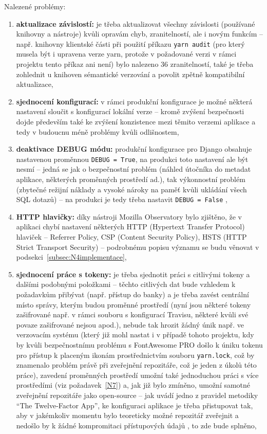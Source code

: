 Nalezené problémy:
\begin{enumerate}[label=\textbf{B\arabic*}]
    \item \label{B1} \textbf{aktualizace závislostí:} je třeba aktualizovat všechny závislosti (používané knihovny a nástroje) kvůli opravám chyb, zranitelností, ale i novým funkcím -- např. knihovny klientské části při použití příkazu \verb|yarn audit| (pro který musela být i upravena verze yarn, protože v požadované verzi v rámci projektu tento příkaz ani není) bylo nalezeno 36 zranitelností, také je třeba zohlednit u knihoven sémantické verzování a povolit zpětně kompatibilní aktualizace,
    \item \label{B2} \textbf{sjednocení konfigurací:} v rámci produkční konfigurace je možné některá nastavení sloučit s konfigurací lokální verze -- kromě zvýšení bezpečnosti dojde především také ke zvýšení konzistence mezi těmito verzemi aplikace a tedy v budoucnu méně problémy kvůli odlišnostem,
    \item \label{B3} \textbf{deaktivace DEBUG módu:} produkční konfigurace pro 
    Django obsahuje nastavenou proměnnou \verb|DEBUG = True|, na produkci toto nastavení ale být nesmí -- jedná se jak o bezpečnostní problém (náhled útočníka do metadat aplikace, některých proměnných prostředí ad.), tak výkonnostní problém (zbytečné režijní náklady a vysoké nároky na paměť kvůli ukládání všech SQL dotazů) -- na produkci je tedy třeba nastavit \verb|DEBUG = False| \cite{django-debug},
    \item \label{B4} \textbf{HTTP hlavičky:} díky nástroji Mozilla Observatory bylo zjištěno, že v aplikaci chybí nastavení některých HTTP (Hypertext Transfer Protocol) hlaviček -- Referrer Policy, CSP (Content Security Policy), HSTS (HTTP Strict Transport Security) -- podrobnému popisu významu se budu věnovat v podsekci~\ref{subsec:N4implementace},
    \item \label{B5} \textbf{sjednocení práce s tokeny:} je třeba sjednotit práci s citlivými tokeny a dalšími podobnými položkami -- těchto citlivých dat bude vzhledem k požadavkům přibývat (např. přístup do banky) a je třeba zavést centrální místo správy, kterým budou proměnné prostředí (nyní jsou některé tokeny zašifrované např. v rámci souboru s konfigurací Travisu, některé kvůli své povaze zašifrované nejsou apod.), nebude tak hrozit žádný únik např. ve verzovacím systému (který již mohl nastat i v případě tohoto projektu, kdy by kvůli bezpečnostnímu problému s FontAwesome PRO \cite{fontawesome-token} došlo k úniku tokenu pro přístup k placeným ikonám prostřednictvím souboru \verb|yarn.lock|, což by znamenalo problém právě při zveřejnění repozitáře, což je jeden z úkolů této práce), zavedení proměnných prostředí umožní také jednoduchou práci s více prostředími (viz požadavek~\ref{N7}) a, jak již bylo zmíněno, umožní samotné zveřejnění repozitáře jako open-source -- jak uvádí jedno z pravidel metodiky \enquote{The Twelve-Factor App}, ke konfiguraci aplikace je třeba přistupovat tak, aby v jakémkoliv momentu bylo teoreticky možné repozitář zveřejnit a nedošlo by k žádné kompromitaci přístupových údajů \cite{12factor-config}, to zde bude splněno,

\end{enumerate}
